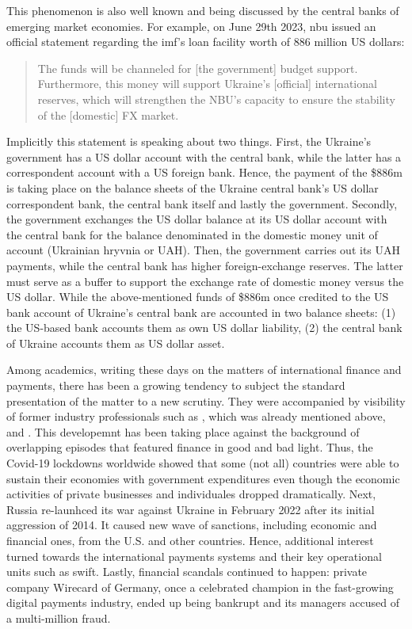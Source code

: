 This phenomenon is also well known and being discussed by the central banks of emerging market economies. For example, on June 29th 2023, \ac{nbu} issued an official statement regarding the \ac{imf}'s loan facility worth of 886 million US dollars:

\begin{quote}
The funds will be channeled for [the government] budget support. Furthermore, this money will support Ukraine's [official] international reserves, which will strengthen the NBU's capacity to ensure the stability of the [domestic] FX market. \cite{nbu2023}
\end{quote}

Implicitly this statement is speaking about two things. First, the Ukraine's government has a US dollar account with the central bank, while the latter has a correspondent account with a US foreign bank. Hence, the payment of the \$886m is taking place on the balance sheets of the Ukraine central bank's US dollar correspondent bank, the central bank itself and lastly the government. Secondly, the government exchanges the US dollar balance at its US dollar account with the central bank for the balance denominated in the domestic money unit of account (Ukrainian hryvnia or UAH). Then, the government carries out its UAH payments, while the central bank has higher foreign-exchange reserves. The latter must serve as a buffer to support the exchange rate of domestic money versus the US dollar. While the above-mentioned funds of \$886m once credited to the US bank account of Ukraine's central bank are accounted in two balance sheets: (1) the US-based bank accounts them as own US dollar liability, (2) the central bank of Ukraine accounts them as US dollar asset.

Among academics, writing these days on the matters of international finance and payments, there has been a growing tendency to subject the standard presentation of the matter to a new scrutiny. They were accompanied by visibility of former industry professionals such as \cite{payoff2021}, which was already mentioned above, and \cite{scott2013,scott2022,scott2024_}. This developemnt has been taking place against the background of overlapping episodes that featured finance in good and bad light. Thus, the Covid-19 lockdowns worldwide showed that some (not all) countries were able to sustain their economies with government expenditures even though the economic activities of private businesses and individuales dropped dramatically. Next, Russia re-launhced its war against Ukraine in February 2022 after its initial aggression of 2014. It caused new wave of sanctions, including economic and financial ones, from the U.S. and other countries. Hence, additional interest turned towards the international payments systems and their key operational units such as \ac{swift}. Lastly, financial scandals continued to happen: private company Wirecard of Germany, once a celebrated champion in the fast-growing digital payments industry, ended up being bankrupt and its managers accused of a multi-million fraud.

